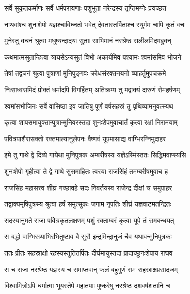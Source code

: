 \twolineshloka
{सर्वे सुकृतकर्माणः सर्वे धर्मपरायणाः}
{पशुभूता नरेन्द्रस्य तृप्तिमग्नेः प्रयच्छत} %

\twolineshloka
{नाथवांश्च शुनःशेपो यज्ञश्चाविघ्नतो भवेत्}
{देवतास्तर्पिताश्च स्युर्मम चापि कृतं वचः} %

\twolineshloka
{मुनेस्तु वचनं श्रुत्वा मधुष्यन्दादयः सुताः}
{साभिमानं नरश्रेष्ठ सलीलमिदमब्रुवन्} %

\twolineshloka
{कथमात्मसुतान्हित्वा त्रायसेऽन्यसुतं विभो}
{अकार्यमिव पश्यामः श्वमांसमिव भोजने} %

\twolineshloka
{तेषां तद्वचनं श्रुत्वा पुत्राणां मुनिपुङ्गवः}
{क्रोधसंरक्तनयनो व्याहर्तुमुपचक्रमे} %

\twolineshloka
{निःसाध्वसमिदं प्रोक्तं धर्मादपि विगर्हितम्}
{अतिक्रम्य तु मद्वाक्यं दारुणं रोमहर्षणम्} %

\twolineshloka
{श्वमांसभोजिनः सर्वे वासिष्ठा इव जातिषु}
{पूर्णं वर्षसहस्रं तु पृथिव्यामनुवत्स्यथ} %

\twolineshloka
{कृत्वा शापसमायुक्तान्पुत्रान्मुनिवरस्तदा}
{शुनःशेपमुवाचार्तं कृत्वा रक्षां निरामयाम्} %

\twolineshloka
{पवित्रपाशैरासक्तो रक्तमाल्यानुलेपनः}
{वैष्णवं यूपमासाद्य वाग्भिरग्निमुदाहर} %

\twolineshloka
{इमे तु गाथे द्वे दिव्ये गायेथा मुनिपुत्रक}
{अम्बरीषस्य यज्ञेऽस्मिंस्ततः सिद्धिमवाप्स्यसि} %

\twolineshloka
{शुनःशेपो गृहीत्वा ते द्वे गाथे सुसमाहितः}
{त्वरया राजसिंहं तमम्बरीषमुवाच ह} %

\twolineshloka
{राजसिंह महासत्त्व शीघ्रं गच्छावहे सदः}
{निवर्तयस्व राजेन्द्र दीक्षां च समुपाहर} %

\twolineshloka
{तद्वाक्यमृषिपुत्रस्य श्रुत्वा हर्षं समुत्सुकः}
{जगाम नृपतिः शीघ्रं यज्ञवाटमतन्द्रितः} %

\twolineshloka
{सदस्यानुमते राजा पवित्रकृतलक्षणम्}
{पशुं रक्ताम्बरं कृत्वा यूपे तं समबन्धयत्} %

\twolineshloka
{स बद्धो वाग्भिरग्र्याभिरभितुष्टाव वै सुरौ}
{इन्द्रमिन्द्रानुजं चैव यथावन्मुनिपुत्रकः} %

\twolineshloka
{ततः प्रीतः सहस्राक्षो रहस्यस्तुतितर्पितः}
{दीर्घमायुस्तदा प्रादाच्छुनःशेपाय राघव} %

\twolineshloka
{स च राजा नरश्रेष्ठ यज्ञस्य च समाप्तवान्}
{फलं बहुगुणं राम सहस्राक्षप्रसादजम्} %

\twolineshloka
{विश्वामित्रोऽपि धर्मात्मा भूयस्तेपे महातपाः}
{पुष्करेषु नरश्रेष्ठ दशवर्षशतानि च} %


